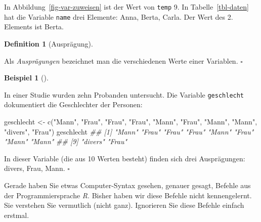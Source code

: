 \documentclass[
  letterpaper,
]{scrbook}
\newenvironment{Shaded}{\begin{snugshade}}{\end{snugshade}}
\newcommand{\DocumentationTok}[1]{\textcolor[rgb]{0.37,0.37,0.37}{\textit{#1}}}
\newcommand{\FunctionTok}[1]{\textcolor[rgb]{0.28,0.35,0.67}{#1}}
\newcommand{\NormalTok}[1]{\textcolor[rgb]{0.00,0.23,0.31}{#1}}
\newcommand{\OtherTok}[1]{\textcolor[rgb]{0.00,0.23,0.31}{#1}}
\newcommand{\StringTok}[1]{\textcolor[rgb]{0.13,0.47,0.30}{#1}}
\theoremstyle{definition}
\theoremstyle{definition}
\newtheorem{example}{Beispiel}[chapter]
\theoremstyle{definition}
\newtheorem{definition}{Definition}[chapter]
\theoremstyle{remark}
\begin{document}
In Abbildung~\ref{fig-var-zuweisen} ist der Wert von \texttt{temp} 9. In
Tabelle~\ref{tbl-daten} hat die Variable \texttt{name} drei Elemente:
Anna, Berta, Carla. Der Wert des 2. Elements ist Berta.

\begin{definition}[Ausprägung]\protect\hypertarget{def-auspraegung}{}\label{def-auspraegung}

Als \emph{Ausprägungen} bezeichnet man die verschiedenen Werte einer
Variablen. \(\square\)

\end{definition}

\begin{example}[]\protect\hypertarget{exm-geschlecht}{}\label{exm-geschlecht}

In einer Studie wurden zehn Probanden untersucht. Die Variable
\texttt{geschlecht} dokumentiert die Geschlechter der Personen:

\begin{Shaded}
\begin{Highlighting}[]
\NormalTok{geschlecht }\OtherTok{\textless{}{-}} \FunctionTok{c}\NormalTok{(}\StringTok{"Mann"}\NormalTok{, }\StringTok{"Frau"}\NormalTok{, }\StringTok{"Frau"}\NormalTok{, }\StringTok{"Frau"}\NormalTok{, }\StringTok{"Mann"}\NormalTok{,}
                \StringTok{"Frau"}\NormalTok{, }\StringTok{"Mann"}\NormalTok{, }\StringTok{"Mann"}\NormalTok{, }\StringTok{"divers"}\NormalTok{, }\StringTok{"Frau"}\NormalTok{)}
\NormalTok{geschlecht}
\DocumentationTok{\#\#  [1] "Mann"   "Frau"   "Frau"   "Frau"   "Mann"   "Frau"   "Mann"   "Mann"  }
\DocumentationTok{\#\#  [9] "divers" "Frau"}
\end{Highlighting}
\end{Shaded}

In dieser Variable (die aus 10 Werten besteht) finden sich drei
Ausprägungen: divers, Frau, Mann. \(\square\)

\end{example}

\begin{tcolorbox}[enhanced jigsaw, colbacktitle=quarto-callout-tip-color!10!white, toptitle=1mm, colframe=quarto-callout-tip-color-frame, breakable, toprule=.15mm, bottomrule=.15mm, bottomtitle=1mm, left=2mm, opacitybacktitle=0.6, colback=white, arc=.35mm, coltitle=black, title=\textcolor{quarto-callout-tip-color}{\faLightbulb}\hspace{0.5em}{Tipp}, opacityback=0, rightrule=.15mm, leftrule=.75mm, titlerule=0mm]

Gerade haben Sie etwas Computer-Syntax gesehen, genauer gesagt, Befehle
aus der Programmiersprache \emph{R}. Bisher haben wir diese Befehle
nicht kennengelernt. Sie verstehen Sie vermutlich (nicht ganz).
Ignorieren Sie diese Befehle einfach erstmal.

\end{tcolorbox}
\end{document}

